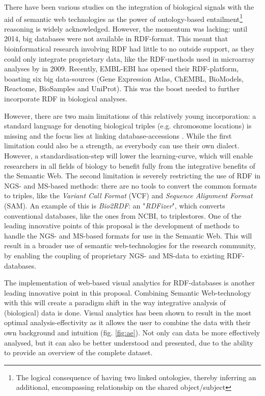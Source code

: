 \documentclass[twoside,fontsize=12pt]{article}
\begin{document}
\noindent
There have been various studies on the integration of biological signals with the aid of semantic web technologies as the power of ontology-based entailment\footnote{The logical consequence of having two linked ontologies, thereby inferring an additional, encompassing relationship on the shared object/subject} reasoning is widely acknowledged\cite{Sahoo2008}. However, the momentum was lacking: until 2014, big databases were not available in RDF-format. This meant that bioinformatical research involving RDF had little to no outside support, as they could only integrate proprietary data, like the RDF-methods used in microarray analyses by \citet{Szpakowski2009} in 2009. Recently, EMBL-EBI has opened their RDF-platform, boasting six big data-sources (Gene Expression Atlas, ChEMBL, BioModels, Reactome, BioSamples and UniProt)\cite{Jupp2014}. This was the boost needed to further incorporate RDF in biological analyses.

However, there are two main limitations of this relatively young incorporation: a standard language for denoting biological triples (e.g. chromosome locations) is missing and the focus lies at linking database-accessions \citep{Ruttenberg2007}. While the first limitation could also be a strength, as everybody can use their own dialect. However, a standardisation-step will lower the learning-curve, which will enable researchers in all fields of biology to benefit fully from the integrative benefits of the Semantic Web. The second limitation is severely restricting the use of RDF in NGS- and MS-based methods: there are no tools to convert the common formats to triples, like the \textit{Variant Call Format} (VCF) and \textit{Sequence Alignment Format} (SAM). An example of this is  \textit{Bio2RDF}\cite{Belleau2008}: an "\textit{RDFizer}", which converts conventional databases, like the ones from NCBI, to triplestores. One of the leading innovative points of this proposal is the development of methods to handle the NGS- and MS-based formats for use in the Semantic Web. This will result in a broader use of semantic web-technologies for the research community, by enabling the coupling of proprietary NGS- and MS-data to existing RDF-databases.
\medskip

\noindent
The implementation of web-based visual analytics for RDF-databases is another leading innovative point in this proposal. Combining Semantic Web-technology with this will create a paradigm shift in the way integrative analysis of (biological) data is done. Visual analytics has been shown to result in the most optimal analysis-effectivity as it allows the user to combine the data with their own background and intuition (fig. \ref{fig:ae}). Not only can data be more effectively analysed, but it can also be better understood and presented, due to the ability to provide an overview of the complete dataset\cite{Thomas2005, Keim}. 
\medskip
\end{document}
